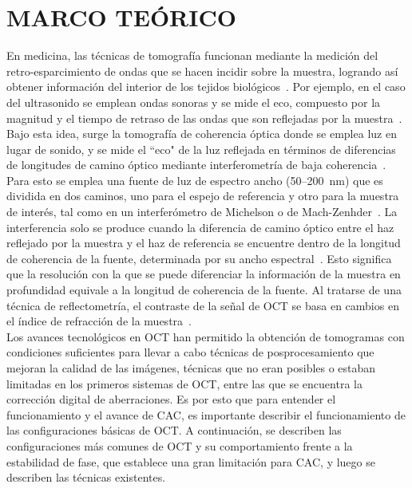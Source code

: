 \documentclass[letter, 12 pt]{article}
\begin{document}

\section{MARCO TEÓRICO} \label{sec:teoria}

En medicina, las técnicas de tomografía funcionan mediante la medición del retro-esparcimiento de ondas que se hacen incidir sobre la muestra, logrando así obtener información del interior de los tejidos biológicos~\cite{guy2005}. Por ejemplo, en el caso del ultrasonido se emplean ondas sonoras y se mide el eco, compuesto por la magnitud y el tiempo de retraso de las ondas que son reflejadas por la muestra~\cite{szabo2004}. Bajo esta idea, surge la tomografía de coherencia óptica donde se emplea luz en lugar de sonido, y se mide el ``eco" de la luz reflejada en términos de diferencias de longitudes de camino óptico mediante interferometría de baja coherencia~\cite{huang1991}. Para esto se emplea una fuente de luz de espectro ancho (50--200~nm) que es dividida en dos caminos, uno para el espejo de referencia y otro para la muestra de interés, tal como en un interferómetro de Michelson o de Mach-Zenhder~\cite{drexler2015}. La interferencia solo se produce cuando la diferencia de camino óptico entre el haz reflejado por la muestra y el haz de referencia se encuentre dentro de la longitud de coherencia de la fuente, determinada por su ancho espectral~\cite{huang1991}. Esto significa que la resolución con la que se puede diferenciar la información de la muestra en profundidad equivale a la longitud de coherencia de la fuente. Al tratarse de una técnica de reflectometría, el contraste de la señal de OCT se basa en cambios en el índice de refracción de la muestra~\cite{drexler2015}. \\

Los avances tecnológicos en OCT han permitido la obtención de tomogramas con condiciones suficientes para llevar a cabo técnicas de posprocesamiento que mejoran la calidad de las imágenes, técnicas que no eran posibles o estaban limitadas en los primeros sistemas de OCT, entre las que se encuentra la corrección digital de aberraciones. Es por esto que para entender el funcionamiento y el avance de CAC, es importante describir el funcionamiento de las configuraciones básicas de OCT. A continuación, se describen las configuraciones más comunes de OCT y su comportamiento frente a la estabilidad de fase, que establece una gran limitación para CAC, y luego se describen las técnicas existentes.
\end{document}
